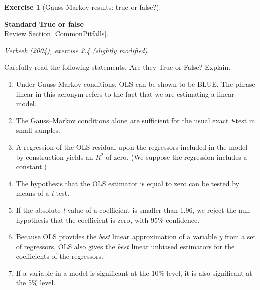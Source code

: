 \documentclass[
  11pt,
]{book}
\theoremstyle{definition}
\theoremstyle{definition}
\theoremstyle{definition}
\newtheorem{exercise}{Exercise}[chapter]
\theoremstyle{definition}
\theoremstyle{remark}
\begin{document}

\begin{exercisebox}

\begin{exercise}[Gauss-Markov results: true or false?]
\protect\hypertarget{exr:regressions-gauss-markov-true-false}{}\label{exr:regressions-gauss-markov-true-false}

\textbf{Standard \textbar{} True or false}\\
Review Section \ref{CommonPitfalls}.

\emph{Verbeek (2004), exercise 2.4 (slightly modified)}

Carefully read the following statements. Are they True or False? Explain.

\begin{enumerate}
\def\labelenumi{\arabic{enumi}.}
\item
  Under Gauss-Markov conditions, OLS can be shown to be BLUE. The phrase linear in this acronym refers to the fact that we are estimating a linear model.
\item
  The Gauss--Markov conditions alone are sufficient for the usual exact \emph{t}-test in small samples.
\item
  A regression of the OLS residual upon the regressors included in the model by construction yields an \(R^2\) of zero. (We suppose the regression includes a constant.)
\item
  The hypothesis that the OLS estimator is equal to zero can be tested by means of a \emph{t}-test.
\item
  If the absolute \emph{t}-value of a coefficient is smaller than 1.96, we reject the null hypothesis that the coefficient is zero, with 95\% confidence.
\item
  Because OLS provides the \emph{best} linear approximation of a variable \(y\) from a set of regressors, OLS also gives the \emph{best} linear unbiased estimators for the coefficients of the regressors.
\item
  If a variable in a model is significant at the 10\% level, it is also significant at the 5\% level.
\end{enumerate}

\end{exercise}

\end{exercisebox}

\end{document}

